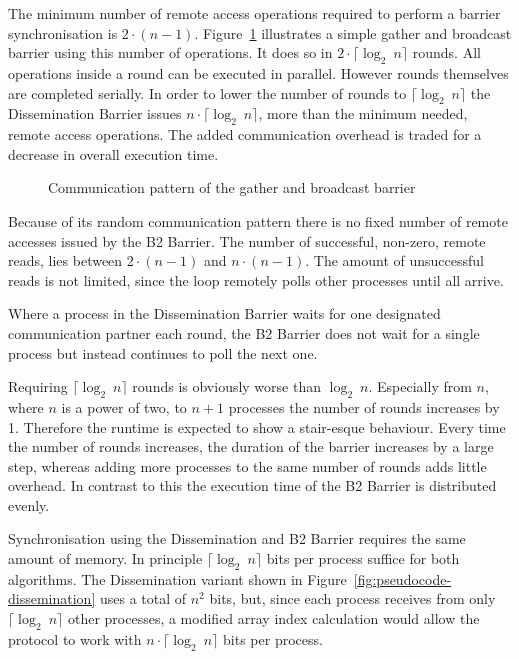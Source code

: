 \documentclass[a4paper, 10pt]{article}
\begin{document}
The minimum number of remote access operations required to perform a barrier synchronisation is $2 \cdot (n-1)$. Figure~\ref{fig:diagram-gather-broadcast} illustrates a simple gather and broadcast barrier using this number of operations. It does so in $2 \cdot  \lceil \log _2~n \rceil$ rounds. All operations inside a round can be executed in parallel. However rounds themselves are completed serially. In order to lower the number of rounds to $\lceil \log _2~n \rceil$ the Dissemination Barrier issues $n \cdot \lceil \log _2~n \rceil$, more than the minimum needed, remote access operations. The added communication overhead is traded for a decrease in overall execution time.

\begin{figure}[htbp]
	\centering
	
	\caption{Communication pattern of the gather and broadcast barrier}
	\label{fig:diagram-gather-broadcast}
\end{figure}

Because of its random communication pattern there is no fixed number of remote accesses issued by the B2 Barrier. The number of successful, non-zero, remote reads, lies between $2 \cdot (n-1)$ and $n \cdot (n-1)$. The amount of unsuccessful reads is not limited, since the loop remotely polls other processes until all arrive.

Where a process in the Dissemination Barrier waits for one designated communication partner each round, the B2 Barrier does not wait for a single process but instead continues to poll the next one.

Requiring $\lceil \log _2~n \rceil$ rounds is obviously worse than $\log _2~n$. Especially from $n$, where $n$ is a power of two, to $n+1$ processes the number of rounds increases by 1. Therefore the runtime is expected to show a stair-esque behaviour. Every time the number of rounds increases, the duration of the barrier increases by a large step, whereas adding more processes to the same number of rounds adds little overhead.
In contrast to this the execution time of the B2 Barrier is distributed evenly.

Synchronisation using the Dissemination and B2 Barrier requires the same amount of memory. In principle $\lceil \log _2~n \rceil$ bits per process suffice for both algorithms. The Dissemination variant shown in Figure~\ref{fig:pseudocode-dissemination} uses a total of $n^2$ bits, but, since each process receives from only $\lceil \log _2~n \rceil$ other processes, a modified array index calculation would allow the protocol to work with $n \cdot \lceil \log _2 ~n \rceil$ bits per process.
\end{document}
